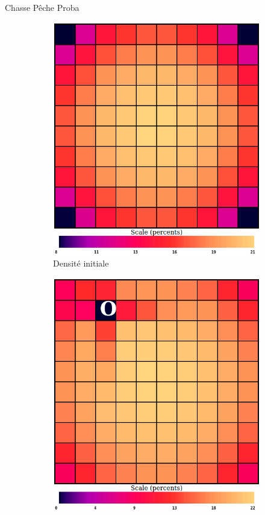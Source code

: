 	\begin{frame}{Chasse Pêche Proba}
	    \begin{figure}
		    \begin{subfigure}{.32\textwidth}
    		    \centering
    		    \includegraphics[width=.95\linewidth]{images/grille_initiale_proba.png}
                \caption*{Densité initiale}
                \label{fig:probaGrilleInit}
            \end{subfigure}
            \begin{subfigure}{.32\textwidth}
                \centering
                \includegraphics[width=.95\linewidth]{images/ploufC2.png}

\end{subfigure}
\end{figure}
\end{frame}
